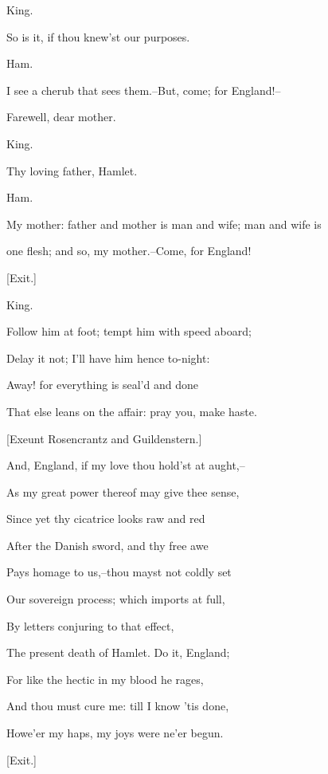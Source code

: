 \documentclass[12pt]{book}
\begin{document}
King.

So is it, if thou knew'st our purposes.



Ham.

I see a cherub that sees them.--But, come; for England!--

Farewell, dear mother.



King.

Thy loving father, Hamlet.



Ham.

My mother: father and mother is man and wife; man and wife is

one flesh; and so, my mother.--Come, for England!



[Exit.]



King.

Follow him at foot; tempt him with speed aboard;

Delay it not; I'll have him hence to-night:

Away! for everything is seal'd and done

That else leans on the affair: pray you, make haste.



[Exeunt Rosencrantz and Guildenstern.]



And, England, if my love thou hold'st at aught,--

As my great power thereof may give thee sense,

Since yet thy cicatrice looks raw and red

After the Danish sword, and thy free awe

Pays homage to us,--thou mayst not coldly set

Our sovereign process; which imports at full,

By letters conjuring to that effect,

The present death of Hamlet. Do it, England;

For like the hectic in my blood he rages,

And thou must cure me: till I know 'tis done,

Howe'er my haps, my joys were ne'er begun.



[Exit.]
\end{document}
